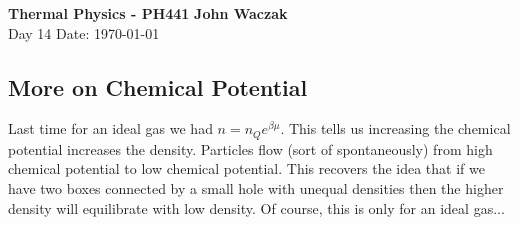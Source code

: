 \documentclass[a4paper, 11pt]{article}
\begin{document}
\noindent
\large\textbf{Thermal Physics - PH441} \hfill \textbf{John Waczak} \\
\normalsize Day 14 \hfill  Date: \today \\

	
\subsection*{More on Chemical Potential} 
	Last time for an ideal gas we had $n = n_Qe^{\beta \mu}$. This tells us increasing the chemical potential increases the density. Particles flow (sort of spontaneously) from high chemical potential to low chemical potential. This recovers the idea that if we have two boxes connected by a small hole with unequal densities then the higher density will equilibrate with low density. Of course, this is only for an ideal gas... \\
	
	
\end{document}

